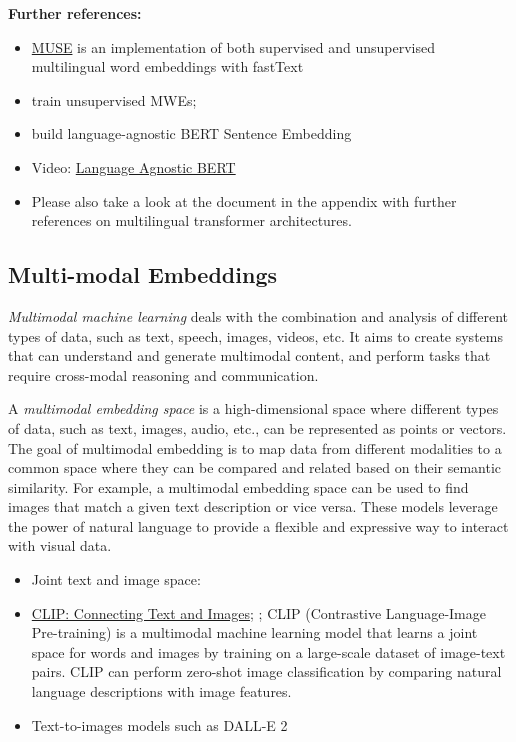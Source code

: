 \documentclass[11pt, a4paper]{amsart}
\begin{document}
\textbf{Further references:}
\begin{itemize}
	\item \href{https://github.com/facebookresearch/MUSE}{MUSE} is an implementation of both supervised and unsupervised multilingual word embeddings with fastText
	\item \cite{DBLP:journals/corr/abs-1808-08933} train unsupervised MWEs;
	\item \cite{DBLP:journals/corr/abs-2007-01852} build language-agnostic BERT Sentence Embedding
	\item Video: \href{https://youtu.be/7tAWk_Coj-s}{Language Agnostic BERT}
	\item Please also take a look at the document in the appendix with further references on multilingual transformer architectures.
\end{itemize}

\subsection{Multi-modal Embeddings}

\emph{Multimodal machine learning} deals with the combination and analysis of different types of data, such as text, speech, images, videos, etc. It aims to create systems that can understand and generate multimodal content, and perform tasks that require cross-modal reasoning and communication.

A \emph{multimodal embedding space} is a high-dimensional space where different types of data, such as text, images, audio, etc., can be represented as points or vectors.
The goal of multimodal embedding is to map data from different modalities to a common space where they can be compared and related based on their semantic similarity.
For example, a multimodal embedding space can be used to find images that match a given text description or vice versa.
These models leverage the power of natural language to provide a flexible and expressive way to interact with visual data.

\begin{itemize}
	\item Joint text and image space:
	\cite{DBLP:journals/corr/abs-2111-07180}
	
	\item \href{https://openai.com/blog/clip/}{CLIP: Connecting Text and Images};
	\cite{radford2021learning};
	CLIP (Contrastive Language-Image Pre-training) is a multimodal machine learning model that learns a joint space for words and images by training on a large-scale dataset of image-text pairs.
	CLIP can perform zero-shot image classification by comparing natural language descriptions with image features.
	
	\item Text-to-images models such as DALL-E 2 \cite{Ramesh2022HierarchicalTI}
\end{itemize}
\end{document}
